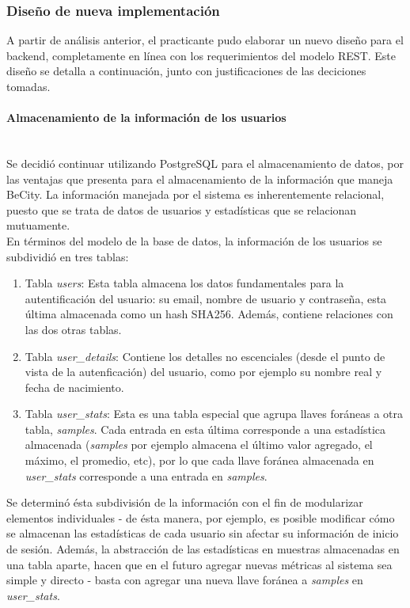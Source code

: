 \documentclass[11pt,letterpaper]{article}
\begin{document}
\subsubsection{Diseño de nueva implementación}

A partir de análisis anterior, el practicante pudo elaborar un nuevo diseño para el backend, completamente en línea con los requerimientos del modelo REST. Este diseño se detalla a continuación, junto con justificaciones de las deciciones tomadas.

\paragraph{Almacenamiento de la información de los usuarios\\\\}
Se decidió continuar utilizando PostgreSQL para el almacenamiento de datos, por las ventajas que presenta para el almacenamiento de la información que maneja BeCity. La información manejada por el sistema es inherentemente relacional, puesto que se trata de datos de usuarios y estadísticas que se relacionan mutuamente.\\

En términos del modelo de la base de datos, la información de los usuarios se subdividió en tres tablas:
\begin{enumerate}
    \item Tabla \emph{users}: Esta tabla almacena los datos fundamentales para la autentificación del usuario: su email, nombre de usuario y contraseña, esta última almacenada como un hash SHA256. Además, contiene relaciones con las dos otras tablas.
    \item Tabla \emph{user\_details}: Contiene los detalles no escenciales (desde el punto de vista de la autenficación) del usuario, como por ejemplo su nombre real y fecha de nacimiento.
    \item Tabla \emph{user\_stats}: Esta es una tabla especial que agrupa llaves foráneas a otra tabla, \emph{samples}. Cada entrada en esta última corresponde a una estadística almacenada (\emph{samples} por ejemplo almacena el último valor agregado, el máximo, el promedio, etc), por lo que cada llave foránea almacenada en \emph{user\_stats} corresponde a una entrada en \emph{samples}.
\end{enumerate}

Se determinó ésta subdivisión de la información con el fin de modularizar elementos individuales - de ésta manera, por ejemplo, es posible modificar cómo se almacenan las estadísticas de cada usuario sin afectar su información de inicio de sesión. Además, la abstracción de las estadísticas en muestras almacenadas en una tabla aparte, hacen que en el futuro agregar nuevas métricas al sistema sea simple y directo - basta con agregar una nueva llave foránea a \emph{samples} en \emph{user\_stats}.
\end{document}
